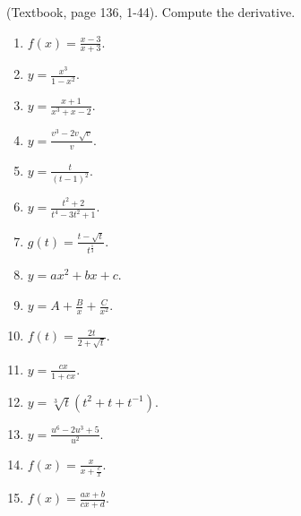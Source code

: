 (Textbook, page 136, 1-44). Compute the derivative.
\begin{multicols}{2}
\begin{enumerate}[ref={\fcProblemRef}]

\item $\displaystyle f(x)=\frac{x-3}{x+3}$.

\item $\displaystyle y=\frac{x^3}{1-x^2}$.

\item $\displaystyle y=\frac{x+1}{x^3+x-2}$.

\item $\displaystyle y=\frac{v^3-2v\sqrt{v}}{v}$.

\item \label{problemd/dt(t/(t-1)^2)}  $\displaystyle y=\frac{t}{(t-1)^2}$.

\item $\displaystyle y=\frac{t^2+2}{t^4-3t^2+1}$.

\item $\displaystyle g(t)=\frac{t-\sqrt{t}}{t^{\frac{1}{3}}}$.

\item $\displaystyle y=a x^2+b x + c$.

\item $\displaystyle y=A+\frac{B}x +\frac{C}{x^2}$.

\item $\displaystyle f(t)=\frac{2t}{2+\sqrt{t}}$.

\item $\displaystyle y=\frac{c x}{1+c x}$.

\item $\displaystyle y=\sqrt[3]{t}(t^2+t+t^{-1}) $.

\item $\displaystyle y=\frac{u^6-2u^3+5}{u^2}$.

\item $\displaystyle f(x)=\frac{x}{x+\frac{c}{x}}$.

\item $\displaystyle f(x)=\frac{a x+b}{c x+ d}$.

\end{enumerate}
\end{multicols}

